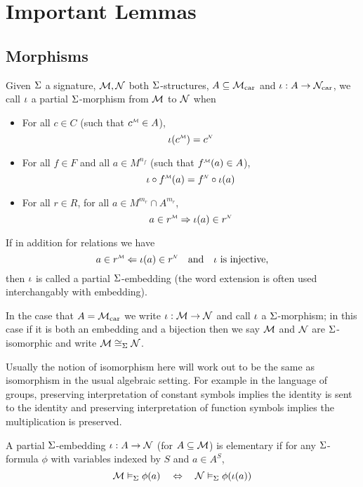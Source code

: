 \section{Important Lemmas}
\subsection{Morphisms}
\begin{dfn}
    Given $\Sigma$ a signature, 
    $\mathcal{M}, \mathcal{N}$ both $\Sigma$-structures, $A \subseteq {\mathcal{M}}_\mathrm{car}$
    and $\iota : A \to {\mathcal{N}}_\mathrm{car}$,
    we call $\iota$ a partial $\Sigma$-morphism from $\mathcal{M}$ to $\mathcal{N}$ when 
    \begin{itemize}
        \item For all $c \in C$ (such that $\mmintp{c} \in A$), 
        \[\io(\mmintp{c}) = \modintp{\NN}{c}\]
        \item For all $f \in F$ and all $a \in M^{n_f}$
        (such that $\mmintp{f}(a) \in A$), 
        \[\io \circ \mmintp{f}(a) = \modintp{\NN}{f} \circ \io(a)\]
        \item For all $r \in R$, for all $a \in M^{m_r} \cap A^{m_r}$,
        \[a \in \mmintp{r} \implies \io (a) \in \modintp{\NN}{r}\]
    \end{itemize}
    If in addition for relations we have
    \[a \in \mmintp{r} \limplies \io (a) \in \modintp{\NN}{r} \quad 
    \text{and} \quad \io \text { is injective,} \]
    then $\iota$ is called a partial $\Sigma$-embedding 
    (the word extension is often used interchangably with embedding). 

    In the case that $A = {\mathcal{M}}_\mathrm{car}$
    we write $\iota : \mathcal{M} \to \mathcal{N}$ and call $\iota$ a 
    $\Sigma$-morphism;
    in this case if it is both an embedding and a bijection then we say 
    $\mathcal{M}$ and $\mathcal{N}$ are $\Sigma$-isomorphic and write $\mathcal{M} \cong_\Sigma \mathcal{N}$.
\end{dfn}
Usually the notion of isomorphism here will work out to be the same as 
isomorphism in the usual algebraic setting.
For example in the language of groups, 
preserving interpretation of constant symbols 
implies the identity is sent to the identity 
and preserving interpretation of function symbols
implies the multiplication is preserved.

\begin{dfn}
    A partial $\Sigma$-embedding $\iota : A \to \mathcal{N}$ (for $A \subseteq \mathcal{M}$)
    is elementary if for any $\Sigma$-formula $\phi$
    with variables indexed by $S$
    and $a \in A^S$,
    \[
        \mathcal{M} \vDash_{\Sigma} \phi(a) \quad \Leftrightarrow \quad \mathcal{N} \vDash_{\Sigma} \phi(\iota(a))
    \]
\end{dfn}

